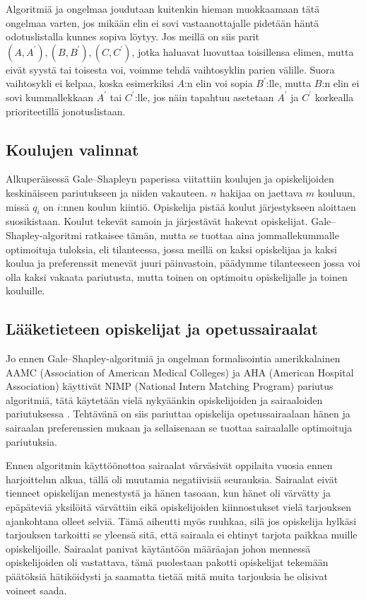 \documentclass[finnish]{tktltiki2}
\theoremstyle{definition}
\theoremstyle{remark}
\begin{document}
Algoritmiä ja ongelmaa joudutaan kuitenkin hieman muokkaamaan tätä ongelmaa varten, jos mikään elin ei sovi vastaanottajalle pidetään häntä odotuslistalla kunnes sopiva löytyy. Jos meillä on siis parit $(A, A^{'}), (B, B^{'}), (C, C^{'})$, jotka haluavat luovuttaa toisillensa elimen, mutta eivät syystä tai toisesta voi, voimme tehdä vaihtosyklin parien välille. Suora vaihtosykli ei kelpaa, koska esimerkiksi $A$:n elin voi sopia $B^{'}$:lle, mutta $B$:n elin ei sovi kummallekkaan $A^{'}$ tai $C^{'}$:lle, jos näin tapahtuu asetetaan $A^{'}$ ja $C^{'}$ korkealla prioriteetillä jonotuslistaan.

\subsection{Koulujen valinnat}
Alkuperäisessä Gale--Shapleyn paperissa \cite{gale62a} viitattiin koulujen ja opiskelijoiden keskinäiseen pariutukseen ja niiden vakauteen. $n$ hakijaa on jaettava $m$ kouluun, missä $q_{i}$ on $i$:nnen koulun kiintiö. Opiskelija pistää koulut järjestykseen aloittaen suosikistaan. Koulut tekevät samoin ja järjestävät hakevat opiskelijat. Gale--Shapley-algoritmi ratkaisee tämän, mutta se tuottaa aina jommallekummalle optimoituja tuloksia, eli tilanteessa, jossa meillä on kaksi opiskelijaa ja kaksi koulua ja preferenssit menevät juuri päinvastoin, päädymme tilanteeseen jossa voi olla kaksi vakaata pariutusta, mutta toinen on optimoitu opiskelijalle ja toinen kouluille.

\subsection{Lääketieteen opiskelijat ja opetussairaalat}
Jo ennen Gale--Shapley-algoritmiä ja ongelman formalisointia amerikkalainen AAMC (Association of American Medical Colleges) ja AHA (American Hospital Association) käyttivät NIMP (National Intern Matching Program) pariutus algoritmiä, tätä käytetään vielä nykyäänkin opiskelijoiden ja sairaaloiden pariutuksessa \cite{roth84}. Tehtävänä on siis pariuttaa opiskelija opetussairaalaan hänen ja sairaalan preferenssien mukaan ja sellaisenaan se tuottaa sairaalalle optimoituja pariutuksia.

Ennen algoritmin käyttöönottoa sairaalat värväsivät oppilaita vuosia ennen harjoittelun alkua, tällä oli muutamia negatiivisiä seurauksia. Sairaalat eivät tienneet opiskelijan menestystä ja hänen tasoaan, kun hänet oli värvätty ja epäpäteviä yksilöitä värvättiin eikä opiskelijoiden kiinnostukset vielä tarjouksen ajankohtana olleet selviä. Tämä aiheutti myös ruuhkaa, silä jos opiskelija hylkäsi tarjouksen tarkoitti se yleensä sitä, että sairaala ei ehtinyt tarjota paikkaa muille opiskelijoille. Sairaalat panivat käytäntöön määräajan johon mennessä opiskelijoiden oli vastattava, tämä puolestaan pakotti opiskelijat tekemään päätöksiä hätiköidysti ja saamatta tietää mitä muita tarjouksia he olisivat voineet saada.
\end{document}
